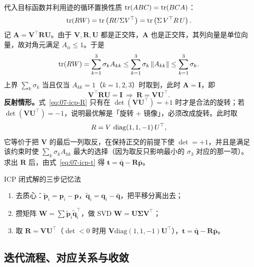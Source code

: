代入目标函数并利用迹的循环置换性质 $\operatorname{tr}(ABC)=\operatorname{tr}(BCA)$：
\begin{equation}
  \operatorname{tr}(RW) = \operatorname{tr}\left(RU\Sigma V^{\top}\right)
  = \operatorname{tr}\left(\Sigma\,V^{\top}R\,U\right).
\end{equation}
记 $\bm{A}=\bm{V}^{\top}\bm{R}\bm{U}$。由于 $\bm{V},\bm{R},\bm{U}$ 都是正交阵，$\bm{A}$ 也是正交阵，其列向量是单位向量，故对角元满足 $A_{ii}\le1$。于是
\begin{equation}
  \operatorname{tr}(RW) = \sum_{k=1}^{3}\sigma_k A_{kk}
  \le \sum_{k=1}^{3}\sigma_k\left\lVert A_{kk} \right\rVert
  \le \sum_{k=1}^{3}\sigma_k.
\end{equation}
上界 $\sum_k\sigma_k$ 当且仅当 $A_{kk}=1$（$k=1,2,3$）时取到，此时 $\bm{A}=\bm{I}$，即
\begin{equation}
  \bm{V}^{\top}\bm{R}\bm{U}=\bm{I}
  \ \Longrightarrow\
  \bm{R}=\bm{V}\bm{U}^{\top}.
  \label{eq:07-icp-R}
\end{equation}
\textbf{反射情形。}式~\eqref{eq:07-icp-R} 只有在 $\det(\bm{V}\bm{U}^{\top})=+1$ 时才是合法的旋转；若 $\det(\bm{V}\bm{U}^{\top})=-1$，说明最优解是「旋转 + 镜像」，必须改成旋转。此时取
\begin{equation}
  R = V\,\operatorname{diag}(1,1,-1)\,U^{\top},
  \label{eq:07-icp-Rfix}
\end{equation}
它等价于把 $\bm{V}$ 的最后一列取反，在保持正交的前提下使 $\det=+1$，并且是满足该约束时使 $\sum_k\sigma_k A_{kk}$ 最大的选择（因为取反只影响最小的 $\sigma_3$ 对应的那一项）。求出 $\bm{R}$ 后，由式~\eqref{eq:07-icp-t} 得 $\bm{t}=\bar{\bm{q}}-\bm{R}\bar{\bm{p}}$。

\begin{keybox}{ICP 闭式解的三步记忆法}
\begin{enumerate}
  \item 去质心：$\tilde{\bm{p}}_i=\bm{p}_i-\bar{\bm{p}}$，$\tilde{\bm{q}}_i=\bm{q}_i-\bar{\bm{q}}$，把平移分离出去；
  \item 攒矩阵 $\bm{W}=\sum\tilde{\bm{p}}_i\tilde{\bm{q}}_i^{\top}$，做 SVD $\bm{W}=\bm{U}\bm{\Sigma}\bm{V}^{\top}$；
  \item 取 $\bm{R}=\bm{V}\bm{U}^{\top}$（$\det<0$ 时用 $\bm{V}\mathrm{diag}(1,1,-1)\bm{U}^{\top}$），$\bm{t}=\bar{\bm{q}}-\bm{R}\bar{\bm{p}}$。
\end{enumerate}
\end{keybox}

\subsection{迭代流程、对应关系与收敛}

